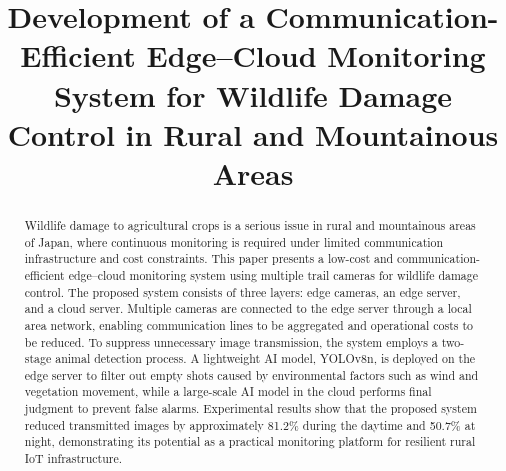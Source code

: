 \documentclass[conference]{IEEEtran}
\begin{document}
\title{Development of a Communication-Efficient Edge--Cloud Monitoring System for Wildlife Damage Control in Rural and Mountainous Areas
}

\author{
\and
{}
\and
{}
\and
{}
\and
{}
}

\maketitle
\vspace{-1.0cm}

\begin{abstract}
Wildlife damage to agricultural crops is a serious issue in rural and mountainous areas of Japan, where continuous monitoring is required under limited communication infrastructure and cost constraints. This paper presents a low-cost and communication-efficient edge--cloud monitoring system using multiple trail cameras for wildlife damage control. The proposed system consists of three layers: edge cameras, an edge server, and a cloud server. Multiple cameras are connected to the edge server through a local area network, enabling communication lines to be aggregated and operational costs to be reduced. To suppress unnecessary image transmission, the system employs a two-stage animal detection process. A lightweight AI model, YOLOv8n, is deployed on the edge server to filter out empty shots caused by environmental factors such as wind and vegetation movement, while a large-scale AI model in the cloud performs final judgment to prevent false alarms. Experimental results show that the proposed system reduced transmitted images by approximately 81.2\% during the daytime and 50.7\% at night, demonstrating its potential as a practical monitoring platform for resilient rural IoT infrastructure.
\end{abstract}
\end{document}
